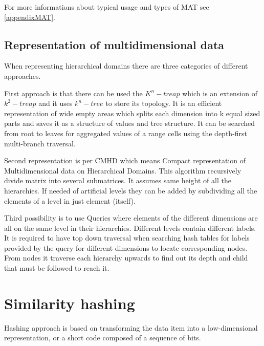 
For more informations about typical usage and types of MAT see \ref{appendixMAT}.


\subsection{Representation of multidimensional data}\label{represOfMultidimData}
When representing hierarchical domains there are three categories of different approaches.

First approach is that there can be used the $K^n-treap$ which is an extension of $k^2-treap$ and it uses $k^n-tree$ to store its topology. It is an efficient representation of wide empty areas which splits each dimension into k equal sized parts and saves it as a structure of values and tree structure. It can be searched from root to leaves for aggregated values of a range cells using the depth-first multi-branch traversal.

Second representation is per CMHD which means Compact representation of Multidimensional data on Hierarchical Domains. This algorithm recursively divide matrix into several submatrices. It assumes same height of all the hierarchies. If needed of artificial levels they can be added by subdividing all the elements of a level in just element (itself).

Third possibility is to use Queries where elements of the different dimensions are all on the same level in their hierarchies. Different levels contain different labels. It is required to have top down traversal when searching hash tables for labels provided by the query for different dimensions to locate corresponding nodes. From nodes it traverse each hierarchy upwards to find out its depth and child that must be followed to reach it. \cite{efficientRepre}
\section{Similarity hashing}\label{similHashing}
Hashing approach is based on transforming the data item into a low-dimensional representation, or a short code composed of a sequence of bits.


